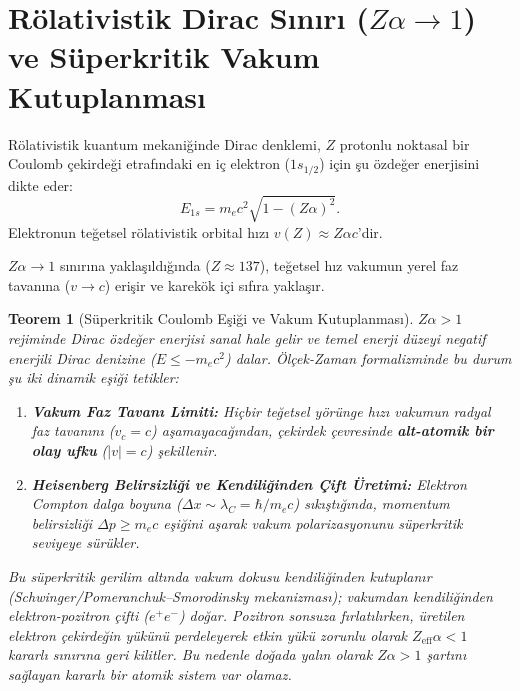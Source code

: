 \documentclass[11pt,a4paper]{article}
\newtheorem{theorem}{Teorem}[section]
\begin{document}
\section{Rölativistik Dirac Sınırı (\texorpdfstring{$Z \alpha \to 1$}{Z alpha -> 1}) ve Süperkritik Vakum Kutuplanması}
\label{sec:superkritik_sinir}

Rölativistik kuantum mekaniğinde Dirac denklemi, $Z$ protonlu noktasal bir Coulomb çekirdeği etrafındaki en iç elektron ($1s_{1/2}$) için şu özdeğer enerjisini dikte eder:
\begin{equation}
    E_{1s} = m_e c^2 \sqrt{1 - (Z\alpha)^2}.
    \label{eq:dirac_enerji}
\end{equation}
Elektronun teğetsel rölativistik orbital hızı $v(Z) \approx Z \alpha c$'dir.

$Z \alpha \to 1$ sınırına yaklaşıldığında ($Z \approx 137$), teğetsel hız vakumun yerel faz tavanına ($v \to c$) erişir ve karekök içi sıfıra yaklaşır.

\begin{theorem}[Süperkritik Coulomb Eşiği ve Vakum Kutuplanması]
    \label{thm:alt_atomik_olay_ufku_p2}
    $Z\alpha > 1$ rejiminde Dirac özdeğer enerjisi sanal hale gelir ve temel enerji düzeyi negatif enerjili Dirac denizine ($E \le -m_e c^2$) dalar. Ölçek-Zaman formalizminde bu durum şu iki dinamik eşiği tetikler:
    \begin{enumerate}
        \item \textbf{Vakum Faz Tavanı Limiti:} Hiçbir teğetsel yörünge hızı vakumun radyal faz tavanını ($v_c = c$) aşamayacağından, çekirdek çevresinde \textbf{alt-atomik bir olay ufku} ($|v| = c$) şekillenir.
        \item \textbf{Heisenberg Belirsizliği ve Kendiliğinden Çift Üretimi:} Elektron Compton dalga boyuna ($\Delta x \sim \lambda_C = \hbar / m_e c$) sıkıştığında, momentum belirsizliği $\Delta p \ge m_e c$ eşiğini aşarak vakum polarizasyonunu süperkritik seviyeye sürükler.
    \end{enumerate}
    Bu süperkritik gerilim altında vakum dokusu kendiliğinden kutuplanır (Schwinger/Pomeranchuk--Smorodinsky mekanizması); vakumdan kendiliğinden elektron-pozitron çifti ($e^+ e^-$) doğar. Pozitron sonsuza fırlatılırken, üretilen elektron çekirdeğin yükünü perdeleyerek etkin yükü zorunlu olarak $Z_{\mathrm{eff}} \alpha < 1$ kararlı sınırına geri kilitler. Bu nedenle doğada yalın olarak $Z\alpha > 1$ şartını sağlayan kararlı bir atomik sistem var olamaz.
\end{theorem}
\end{document}
